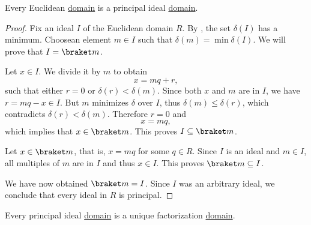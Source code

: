 \begin{proposition}\label{thm:euclidean_domain_is_pid}
  Every Euclidean \hyperref[def:semiring/euclidean_domain]{domain} is a principal ideal \hyperref[def:semiring/principal_ideal_domain]{domain}.
\end{proposition}
\begin{proof}
  Fix an ideal \( I \) of the Euclidean domain \( R \). By , the set \( \delta(I) \) has a minimum. Choose\AOC an element \( m \in I \) such that \( \delta(m) = \min \delta(I) \). We will prove that \( I = \braket m \).

  Let \( x \in I \). We divide it by \( m \) to obtain
  \begin{equation*}
    x = mq + r,
  \end{equation*}
  such that either \( r = 0 \) or \( \delta(r) < \delta(m) \). Since both \( x \) and \( m \) are in \( I \), we have \( r = mq - x \in I \). But \( m \) minimizes \( \delta \) over \( I \), thus \( \delta(m) \leq \delta(r) \), which contradicts \( \delta(r) < \delta(m) \). Therefore \( r = 0 \) and
  \begin{equation*}
    x = mq,
  \end{equation*}
  which implies that \( x \in \braket m \). This proves \( I \subseteq \braket m \).

  Let \( x \in \braket m \), that is, \( x = mq \) for some \( q \in R \). Since \( I \) is an ideal and \( m \in I \), all multiples of \( m \) are in \( I \) and thus \( x \in I \). This proves \( \braket m \subseteq I \).

  We have now obtained \( \braket m = I \). Since \( I \) was an arbitrary ideal, we conclude that every ideal in \( R \) is principal.
\end{proof}

\begin{proposition}\label{thm:pid_is_ufd}
  Every principal ideal \hyperref[def:semiring/principal_ideal_domain]{domain} is a unique factorization \hyperref[def:semiring/unique_factorization_domain]{domain}.
\end{proposition}


